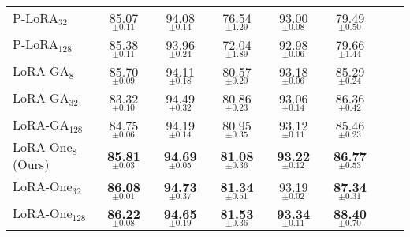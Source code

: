 \begin{table*}[t]
\begin{tabular}{lccccccc}
$\text{P-LoRA}_{32}$        &    85.07$_{\pm 0.11}$   &     94.08$_{\pm 0.14}$      &    76.54$_{\pm 1.29}$       &      93.00$_{\pm 0.08}$     &   79.49$_{\pm 0.50}$   \\
$\text{P-LoRA}_{128}$        &    85.38$_{\pm 0.11}$      &   93.96$_{\pm 0.24}$       &    72.04$_{\pm 1.89}$      &    92.98$_{\pm 0.06}$       &  79.66$_{\pm 1.44}$  \\
\midrule
$\text{LoRA-GA}_{8}$        & 85.70$_{\pm0.09}$ & 94.11$_{\pm0.18}$ & 80.57$_{\pm0.20}$ & 93.18$_{\pm0.06}$ & 85.29$_{\pm0.24}$ \\
$\text{LoRA-GA}_{32}$        &    83.32$_{\pm 0.10}$       &    94.49$_{\pm 0.32}$               &     80.86$_{\pm 0.23}$     &      93.06$_{\pm 0.14}$             &  86.36$_{\pm 0.42}$       \\
$\text{LoRA-GA}_{128}$        &    84.75$_{\pm 0.06}$    &    94.19$_{\pm 0.14}$               &   80.95$_{\pm 0.35}$       &          93.12$_{\pm 0.11}$         &  85.46$_{\pm 0.23}$      \\
\midrule
$\text{LoRA-One}_{8}$ (Ours)        &     \textbf{85.81}$_{\pm 0.03}$      &   \textbf{94.69}$_{\pm 0.05}$           &    \textbf{81.08}$_{\pm 0.36}$     &    \textbf{93.22}$_{\pm 0.12}$     &     \textbf{86.77}$_{\pm 0.53}$    \\
$\text{LoRA-One}_{32}$        &     \textbf{86.08}$_{\pm 0.01}$    &    \textbf{94.73}$_{\pm 0.37}$     &   \textbf{81.34}$_{\pm 0.51}$      &    93.19$_{\pm 0.02}$     &   \textbf{87.34}$_{\pm 0.31}$  \\
$\text{LoRA-One}_{128}$        &     \textbf{86.22}$_{\pm 0.08}$    &   \textbf{94.65}$_{\pm 0.19}$        &     \textbf{81.53}$_{\pm 0.36}$     &   \textbf{93.34}$_{\pm 0.11}$    &   \textbf{88.40}$_{\pm 0.70}$ \\
\bottomrule
\end{tabular}
\end{table*}

